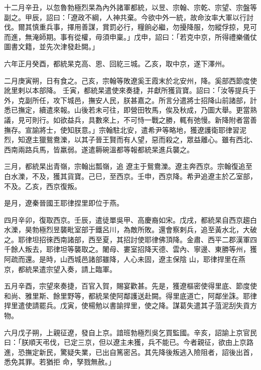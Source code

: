 \begin{pinyinscope}
 十二月辛丑，以忽魯勃極烈杲為內外諸軍都統，以昱、宗翰、宗乾、宗望、宗盤等副之。甲辰，詔曰：「遼政不綱，人神共棄。今欲中外一統，故命汝率大軍以行討伐。爾其慎重兵事，擇用善謀，賞罰必行，糧餉必繼，勿擾降服，勿縱俘掠，見可而進，無淹師期。事有從權，毋須申稟。」戊申，詔曰：「若克中京，所得禮樂儀仗圖書文籍，並先次津發赴闕。」



 六年正月癸酉，都統杲克高、恩、回紇三城。乙亥，取中京，遂下澤州。



 二月庚寅朔，日有食之。己亥，宗翰等敗遼奚王霞末於北安州，降。奚部西節度使訛里剌以本部降。
 壬寅，都統杲遣使來奏捷，并獻所獲貨寶。詔曰：「汝等提兵于外，克副所任，攻下城邑，撫安人民，朕甚嘉之。所言分遣將士招降山前諸部，計悉已撫定，續遣來報。山後若未可往，即營田牧馬，俟及秋成，乃圖大舉。更當熟議，見可則行。如欲益兵，具數來上，不可恃一戰之勝，輒有弛慢。新降附者當善撫存。宣諭將士，使知朕意。」宗翰駐北安，遣希尹等略地，獲遼護衛耶律習泥烈，知遼主獵鴛鴦濼，以其子晉王賢而有人望，惡而殺之，眾益離心。雖有西北、西南兩路兵馬，皆羸弱。遂遣耨碗溫都等報都統杲進兵襲之。



 三月，都統杲出青嶺，宗翰出瓢嶺，追
 遼主于鴛鴦濼。遼主奔西京。宗翰復追至白水濼，不及，獲其貨寶。己巳，至西京。壬申，西京降。希尹追遼主於乙室部，不及。乙亥，西京復叛。



 是月，遼秦晉國王耶律捏里即位于燕。



 四月辛卯，復取西京。壬辰，遣徒單吳甲、高慶裔如宋。戊戌，都統杲自西京趨白水濼，昊勃極烈昱襲毗室部于鐵呂川，為敵所敗。還會察剌兵，追至黃水北，大破之。耶律坦招徠西南諸部，西至夏，其招討使耶律佛頂降。金肅、西平二郡漢軍四千餘人叛去，耶律坦等襲取之。闍母、婁室招降天德、雲內、寧邊、東勝等州，獲阿疏而還。是時，山西城邑諸部雖降，人心未固，遼主保陰
 山，耶律捍里在燕京，都統杲遣宗望入奏，請上臨軍。



 五月辛酉，宗望來奏捷，百官入賀，賜宴歡甚。先是，獲遼樞密使得里底、節度使和尚、雅里斯、餘里野等，都統杲使阿鄰護送赴闕。得里底道亡，阿鄰坐誅。耶律捍里遣使請罷兵。戊寅，使楊勉以書諭捍里，使之降。謀葛失遣其子菹泥刮失貢方物。



 六月戊子朔，上親征遼，發自上京。諳班勃極烈吳乞買監國。辛亥，詔諭上京官民曰：「朕順天弔伐，已定三京，但以遼主未獲，兵不能已。今者親征，欲由上京路進，恐撫定新民，驚疑失業，已出自篤密呂。其先降後叛逃入險阻者，詔後出首，悉免其罪。若猶拒
 命，孥戮無赦。」




\end{pinyinscope}
